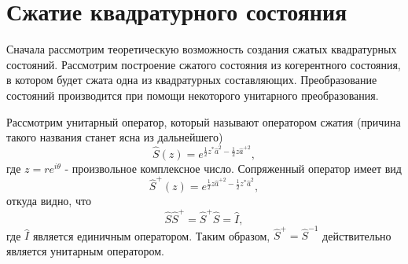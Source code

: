 \section{Сжатие квадратурного состояния}
Сначала рассмотрим теоретическую возможность создания сжатых
квадратурных состояний. Рассмотрим построение сжатого состояния из
когерентного состояния, в котором будет сжата одна из квадратурных
составляющих. Преобразование состояний производится при помощи
некоторого унитарного преобразования.

Рассмотрим унитарный оператор, который называют оператором сжатия
(причина такого названия станет ясна из дальнейшего)
\begin{equation}
\hat{S}\left(z\right) = e^{\frac{1}{2}z^{*}\hat{a}^2 -
\frac{1}{2}z\hat{a}^{+2}},
\nonumber
\end{equation}
где $z = r e^{i\theta}$ - произвольное комплексное число.
Сопряженный оператор имеет вид
\begin{equation}
\hat{S}^{+}\left(z\right) = e^{\frac{1}{2}z\hat{a}^{+2} -
\frac{1}{2}z^{*}\hat{a}^{2}}, 
\nonumber
\end{equation}
откуда видно, что
\begin{equation}
\hat{S} \hat{S}^{+} = \hat{S}^{+} \hat{S} = \hat{I},
\nonumber
\end{equation}
где $\hat{I}$ является единичным оператором. Таким образом, $\hat{S}^{+} =
\hat{S}^{-1}$ действительно является унитарным оператором.

